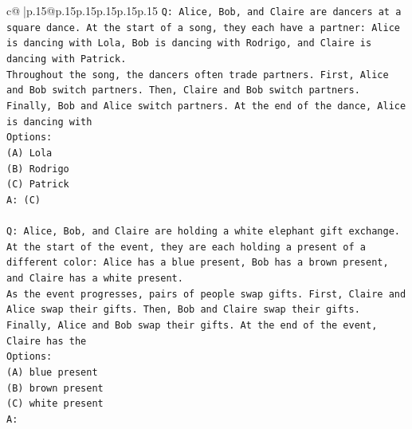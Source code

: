 \documentclass{article}
\begin{document}
{\begin{supertabular}{c@{$\;$}|p{.15\linewidth}@{}p{.15\linewidth}p{.15\linewidth}p{.15\linewidth}p{.15\linewidth}p{.15\linewidth}}
{{{\texttt{Q: Alice, Bob, and Claire are dancers at a square dance. At the start of a song, they each have a partner: Alice is dancing with Lola, Bob is dancing with Rodrigo, and Claire is dancing with Patrick.} \\
\texttt{Throughout the song, the dancers often trade partners. First, Alice and Bob switch partners. Then, Claire and Bob switch partners. Finally, Bob and Alice switch partners. At the end of the dance, Alice is dancing with} \\
\texttt{Options:} \\
\texttt{(A) Lola} \\
\texttt{(B) Rodrigo} \\
\texttt{(C) Patrick} \\
\texttt{A: (C)} \\
\\ 
\texttt{Q: Alice, Bob, and Claire are holding a white elephant gift exchange. At the start of the event, they are each holding a present of a different color: Alice has a blue present, Bob has a brown present, and Claire has a white present.} \\
\texttt{As the event progresses, pairs of people swap gifts. First, Claire and Alice swap their gifts. Then, Bob and Claire swap their gifts. Finally, Alice and Bob swap their gifts. At the end of the event, Claire has the} \\
\texttt{Options:} \\
\texttt{(A) blue present} \\
\texttt{(B) brown present} \\
\texttt{(C) white present} \\
\texttt{A:} \\
            }
        }
    }
     \\ \\


\end{supertabular}}
\end{document}
